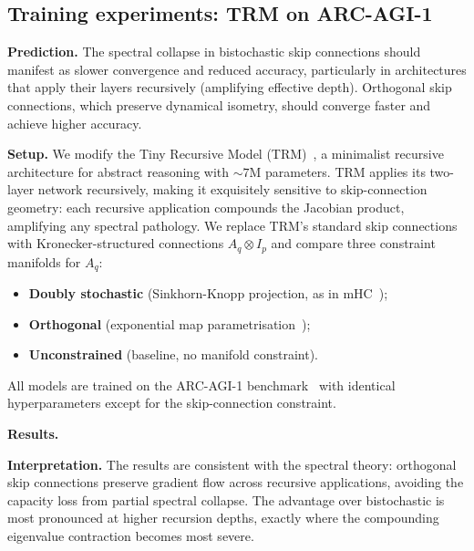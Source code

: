 \subsection{Training experiments: TRM on ARC-AGI-1}\label{sec:trm-experiments}

\noindent\textbf{Prediction.}
The spectral collapse in bistochastic skip connections should manifest as slower convergence and reduced accuracy, particularly in architectures that apply their layers recursively (amplifying effective depth). Orthogonal skip connections, which preserve dynamical isometry, should converge faster and achieve higher accuracy.

\medskip
\noindent\textbf{Setup.}
We modify the Tiny Recursive Model (TRM)~\cite{jolicoeur2025trm}, a minimalist recursive architecture for abstract reasoning with $\sim\!7$M parameters. TRM applies its two-layer network recursively, making it exquisitely sensitive to skip-connection geometry: each recursive application compounds the Jacobian product, amplifying any spectral pathology. We replace TRM's standard skip connections with Kronecker-structured connections $A_q \otimes I_p$ and compare three constraint manifolds for $A_q$:
\begin{itemize}
\item \textbf{Doubly stochastic} (Sinkhorn-Knopp projection, as in mHC~\cite{xie2025mhc});
\item \textbf{Orthogonal} (exponential map parametrisation~\cite{lezcano2019trivializations});
\item \textbf{Unconstrained} (baseline, no manifold constraint).
\end{itemize}
All models are trained on the ARC-AGI-1 benchmark~\cite{chollet2019arc} with identical hyperparameters except for the skip-connection constraint.

\medskip
\noindent\textbf{Results.}

\medskip
\noindent\textbf{Interpretation.}
The results are consistent with the spectral theory: orthogonal skip connections preserve gradient flow across recursive applications, avoiding the capacity loss from partial spectral collapse. The advantage over bistochastic is most pronounced at higher recursion depths, exactly where the compounding eigenvalue contraction becomes most severe.
